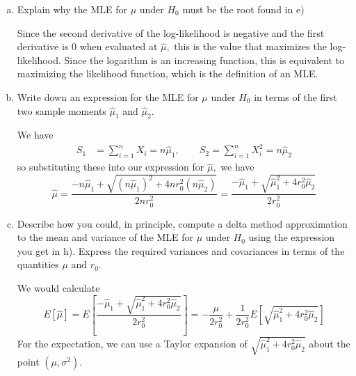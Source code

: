 \documentclass{article}
\begin{document}
\begin{itemize}
\begin{enumerate}[(a)]
\begin{proof}
					The second derivative of the log-likelihood evaluated at $\hat{\mu}$ is given by
					\begin{align*}
						\frac{\partial}{\partial\mu}\left[ \frac{-nr_0^2\mu^2-\mu S_1+S_2}{r_0^2 \mu^3} \right]\Bigg\vert_{\hat{\mu}} &= \frac{r_0^2\mu^3(-2nr_0^2-S_1) - 3r_0^2\mu^2(-nr_0^2\mu^2-\mu S_1+S_2) }{(r_0^2 \mu^3)^2} \Bigg\vert_{\hat{\mu}} \\
						&= \frac{-2nr_0^2-S_2}{r_0^2 \hat\mu^3} < 0
					\end{align*}
					since the right part of the numerator evaluates to 0. This is less than 0 because $S_2$ is a sum of squares, and $nr_0^2$ is also positive. Thus, the second derivative of the log-likelihood is negative when evaluated at the MLE, as desired.
				\end{proof}

			\item Explain why the MLE for $\mu$ under $H_0$ must be the root found in e)
				\begin{answer*}
					Since the second derivative of the log-likelihood is negative and the first derivative is 0 when evaluated at $\hat{\mu},$ this is the value that maximizes the log-likelihood. Since the logarithm is an increasing function, this is equivalent to maximizing the likelihood function, which is the definition of an MLE.
				\end{answer*}

			\item Write down an expression for the MLE for $\mu$ under $H_0$ in terms of the first two sample moments $\hat{\mu}_1$ and $\hat{\mu}_2.$ 
				\begin{answer*}
					We have
					\begin{align*}
						S_1 &= \sum_{i=1}^{n} X_i= n\hat\mu_1, \quad\quad S_2 = \sum_{i=1}^{n} X_i^2 = n\hat\mu_2
					\end{align*}
					so substituting these into our expression for $\hat{\mu},$ we have \[\hat{\mu} = \frac{-n\hat\mu_1 + \sqrt{(n\hat\mu_1)^2+4nr_0^2(n\hat\mu_2)}}{2nr_0^2}=\frac{-\hat\mu_1 + \sqrt{\hat\mu_1^2 + 4r_0^2\hat\mu_2}}{2r_0^2}\]
				\end{answer*}

			\item Describe how you could, in principle, compute a delta method approximation to the mean and variance of the MLE for $\mu$ under $H_0$ using the expression you get in h). Express the required variances and covariances in terms of the quantities $\mu$ and $r_0.$ 
				\begin{soln}
					We would calculate \[E[\hat{\mu}] = E\left[ \frac{-\hat\mu_1+\sqrt{\hat\mu_1^2+4r_0^2\hat\mu_2}}{2r_0^2} \right] = -\frac{\mu}{2r_0^2} + \frac{1}{2r_0^2}E\left[ \sqrt{\hat\mu_1^2+4r_0^2\hat\mu_2} \right]\] For the expectation, we can use a Taylor expansion of $\sqrt{\hat\mu_1^2+4r_0^2\hat\mu_2}$ about the point $(\mu, \sigma^2).$


\end{soln}
\end{enumerate}
\end{itemize}
\end{document}
